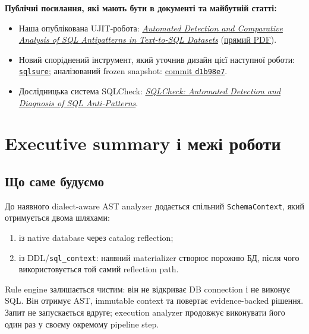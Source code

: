 \documentclass[11pt,a4paper]{article}
\begin{document}
\begin{mustbox}
\textbf{Публічні посилання, які мають бути в документі та майбутній статті:}
\begin{itemize}
\item Наша опублікована UJIT-робота:
  \href{https://doi.org/10.23939/ujit2026.01.135}
  {\textit{Automated Detection and Comparative Analysis of SQL Antipatterns in Text-to-SQL Datasets}}
  (\href{https://science.lpnu.ua/sites/default/files/journal-paper/2026/apr/42369/15sabadoshkocovskiy135-143.pdf}{прямий PDF}).
\item Новий споріднений інструмент, який уточнив дизайн цієї наступної роботи:
  \href{https://github.com/sqlsure/sqlsure}{\texttt{sqlsure}};
  аналізований frozen snapshot:
  \href{https://github.com/sqlsure/sqlsure/tree/d1b98e741f848ce7d756ee1d672e206d6ec39daa}{commit \texttt{d1b98e7}}.
\item Дослідницька система SQLCheck:
  \href{https://doi.org/10.1145/3318464.3389754}
  {\textit{SQLCheck: Automated Detection and Diagnosis of SQL Anti-Patterns}}.
\end{itemize}
\end{mustbox}

\tableofcontents
\clearpage

\section{Executive summary і межі роботи}

\subsection{Що саме будуємо}

До наявного dialect-aware AST analyzer додається спільний \texttt{SchemaContext},
який отримується двома шляхами:

\begin{enumerate}
\item із native database через catalog reflection;
\item із DDL/\texttt{sql\_context}: наявний materializer створює порожню БД, після чого
      використовується той самий reflection path.
\end{enumerate}

Rule engine залишається чистим: він не відкриває DB connection і не виконує SQL.
Він отримує AST, immutable context та повертає evidence-backed рішення. Запит не
запускається вдруге; execution analyzer продовжує виконувати його один раз у своєму
окремому pipeline step.
\end{document}

